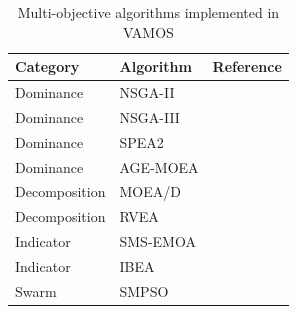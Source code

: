 \documentclass[journal]{IEEEtran}
\newcommand{\VAMOS}{VAMOS}
\begin{document}
\begin{table}[htbp]
\centering
\caption{Multi-objective algorithms implemented in \VAMOS{}}
\label{tab:algorithms}
\setlength{\tabcolsep}{3pt}
\begin{tabular}{llc}
\toprule
\textbf{Category} & \textbf{Algorithm} & \textbf{Reference} \\
\midrule
Dominance     & NSGA-II  &  \cite{DPA+02} \\
Dominance     & NSGA-III &  \cite{DJ14} \\
Dominance     & SPEA2    &  \cite{ZLT01} \\
Dominance     & AGE-MOEA &  \cite{panichella19} \\
Decomposition & MOEA/D   &  \cite{ZL07} \\
Decomposition & RVEA     &  \cite{CJO+16} \\
Indicator     & SMS-EMOA &  \cite{BNE07} \\
Indicator     & IBEA     &  \cite{ZK04} \\
Swarm         & SMPSO    & \cite{NDC09} \\
\bottomrule
\end{tabular}
\end{table}

\end{document}

